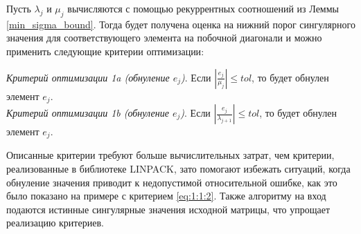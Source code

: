 Пусть $\lambda_j$ и $\mu_j$ вычисляются с помощью рекуррентных соотношений из Леммы \ref{min_sigma_bound}. Тогда будет получена оценка на нижний порог сингулярного значения для соответствующего элемента на побочной диагонали и можно применить следующие критерии оптимизации\cite{Demmel1990}:

\noindent\textit{Критерий оптимизации 1a (обнуление $e_j$)}. Если $|\frac{e_j}{\mu_j}|\leq tol$, то будет обнулен элемент $e_j$.\vspace{1em}
\\\textit{Критерий оптимизации 1b (обнуление $e_j$)}. Если $|\frac{e_j}{\lambda_{j+1}}|\leq tol$, то будет обнулен элемент $e_j$.\vspace{1em}

Описанные критерии требуют больше вычислительных затрат, чем критерии, реализованные в библиотеке LINPACK, зато помогают избежать ситуаций, когда обнуление значения приводит к недопустимой относительной ошибке, как это было показано на примере с критерием \eqref{eq:1:1:2}. Также алгоритму на вход подаются истинные сингулярные значения исходной матрицы, что упрощает реализацию критериев.



